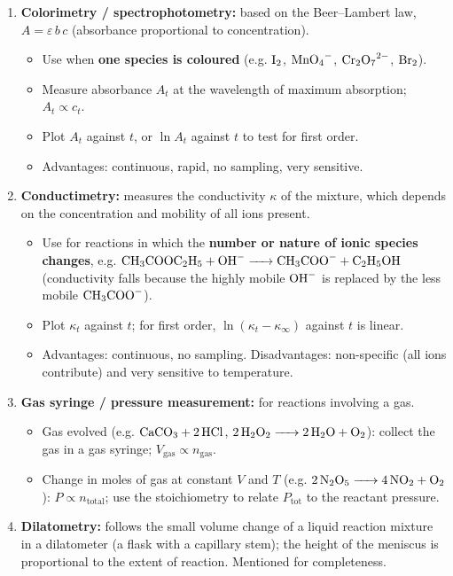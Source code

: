\documentclass[11pt]{article}
\begin{document}
\begin{methode}
\begin{enumerate}
\item \textbf{Colorimetry / spectrophotometry:} based on the Beer--Lambert law, $A = \varepsilon\, b\, c$ (absorbance proportional to concentration).
    \begin{itemize}
    \item Use when \textbf{one species is coloured} (e.g. $\ce{I2}$, $\ce{MnO4-}$, $\ce{Cr2O7^2-}$, $\ce{Br2}$).
    \item Measure absorbance $A_t$ at the wavelength of maximum absorption; $A_t \propto c_t$.
    \item Plot $A_t$ against $t$, or $\ln A_t$ against $t$ to test for first order.
    \item Advantages: continuous, rapid, no sampling, very sensitive.
    \end{itemize}
\item \textbf{Conductimetry:} measures the conductivity $\kappa$ of the mixture, which depends on the concentration and mobility of all ions present.
    \begin{itemize}
    \item Use for reactions in which the \textbf{number or nature of ionic species changes}, e.g. $\ce{CH3COOC2H5 + OH- -> CH3COO- + C2H5OH}$ (conductivity falls because the highly mobile $\ce{OH-}$ is replaced by the less mobile $\ce{CH3COO-}$).
    \item Plot $\kappa_t$ against $t$; for first order, $\ln(\kappa_t - \kappa_\infty)$ against $t$ is linear.
    \item Advantages: continuous, no sampling. Disadvantages: non-specific (all ions contribute) and very sensitive to temperature.
    \end{itemize}
\item \textbf{Gas syringe / pressure measurement:} for reactions involving a gas.
    \begin{itemize}
    \item Gas evolved (e.g. $\ce{CaCO3 + 2HCl}$, $\ce{2H2O2 -> 2H2O + O2}$): collect the gas in a gas syringe; $V_{\text{gas}} \propto n_{\text{gas}}$.
    \item Change in moles of gas at constant $V$ and $T$ (e.g. $\ce{2N2O5 -> 4NO2 + O2}$): $P \propto n_{\text{total}}$; use the stoichiometry to relate $P_{\text{tot}}$ to the reactant pressure.
    \end{itemize}
\item \textbf{Dilatometry:} follows the small volume change of a liquid reaction mixture in a dilatometer (a flask with a capillary stem); the height of the meniscus is proportional to the extent of reaction. Mentioned for completeness.
\end{enumerate}
\end{methode}
\end{document}
